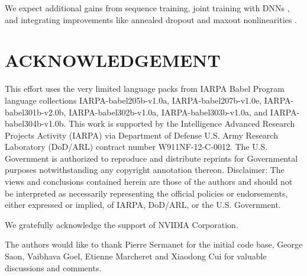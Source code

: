 \documentclass{article}
\begin{document}
We expect additional gains from sequence training, joint training with DNNs \cite{soltau2014joint}, and
integrating improvements like annealed dropout and maxout nonlinearities \cite{saon2015ibm}.

\section{ACKNOWLEDGEMENT}
This effort uses the very limited language packs from IARPA Babel
Program language collections IARPA-babel205b-v1.0a,
IARPA-babel207b-v1.0e, IARPA-babel301b-v2.0b, IARPA-babel302b-v1.0a,
IARPA-babel303b-v1.0a, and IARPA-babel304b-v1.0b.  This work is
supported by the Intelligence Advanced Research Projects Activity
(IARPA) via Department of Defense U.S. Army Research Laboratory
(DoD/ARL) contract number W911NF-12-C-0012. The U.S. Government is
authorized to reproduce and distribute reprints for Governmental
purposes notwithstanding any copyright annotation thereon.
Disclaimer: The views and conclusions contained herein are those of
the authors and should not be interpreted as necessarily representing
the official policies or endorsements, either expressed or implied, of
IARPA, DoD/ARL, or the U.S. Government.

We gratefully acknowledge the support of NVIDIA Corporation.

The authors would like to thank Pierre Sermanet for the initial code
base, George Saon, Vaibhava Goel, Etienne Marcheret and Xiaodong Cui for valuable
discussions and comments.





\end{document}
